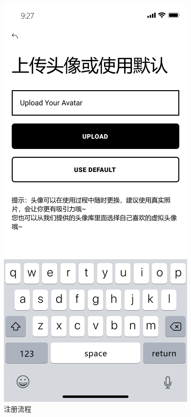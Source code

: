 \documentclass[UTF8]{ctexart}
\begin{document}
\begin{figure}[htbp]
{\begin{minipage}[b]{.3\linewidth}
            \includegraphics[scale=0.3]{Registerstep3.png}
        \end{minipage}
    }
    \caption{注册流程}
    \label{Register}
\end{figure}
\end{document}
